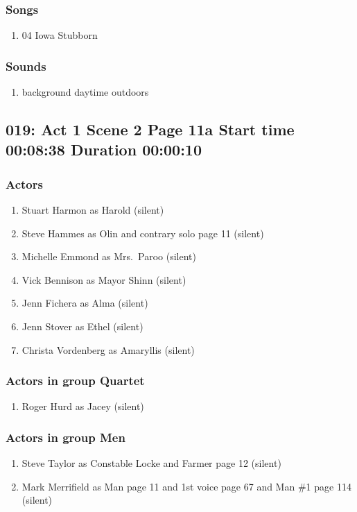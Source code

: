 \subsubsection{Songs}
\begin{enumerate}
\item 04 Iowa Stubborn
\end{enumerate}\subsubsection{Sounds}
\begin{enumerate}
\item background daytime outdoors
\end{enumerate}
\subsection{019: Act 1 Scene 2 Page 11a Start time 00:08:38 Duration 00:00:10}

\subsubsection{Actors}
\begin{enumerate}
\item Stuart Harmon as Harold (silent)
\item Steve Hammes as Olin and contrary solo page 11 (silent)
\item Michelle Emmond as Mrs.~Paroo (silent)
\item Vick Bennison as Mayor Shinn (silent)
\item Jenn Fichera as Alma (silent)
\item Jenn Stover as Ethel (silent)
\item Christa Vordenberg as Amaryllis (silent)
\end{enumerate}
\subsubsection{Actors in group Quartet}
\begin{enumerate}
\item Roger Hurd as Jacey (silent)
\end{enumerate}
\subsubsection{Actors in group Men}
\begin{enumerate}
\item Steve Taylor as Constable Locke and Farmer page 12 (silent)
\item Mark Merrifield as Man page 11 and 1st voice page 67 and Man \#1 page 114 (silent)
\end{enumerate}
